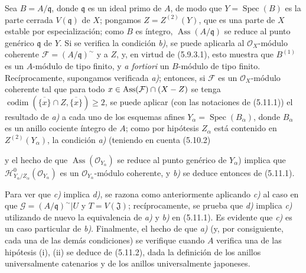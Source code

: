 Sea $B=A/\mathfrak q$, donde $\mathfrak q$ es un ideal primo de $A$, de modo
que $Y=\operatorname{Spec}(B)$ es la parte cerrada $V(\mathfrak q)$ de $X$;
pongamos $Z=Z^{(2)}(Y)$, que es una parte de $X$ estable por especialización;
como $B$ es íntegro, $\operatorname{Ass}(A/\mathfrak q)$ se reduce al punto
genérico $\mathfrak q$ de $Y$. Si se verifica la condición \emph{b)}, se puede
aplicarla al $\mathcal O_X$-módulo coherente
$\mathcal F=(A/\mathfrak q)^\sim$ y a $Z$, y, en virtud de (5.9.3.1), esto
muestra que $B^{(1)}$ es un $A$-módulo de tipo finito, y \emph{a fortiori} un
$B$-módulo de tipo finito. Recíprocamente, supongamos verificada \emph{a)}; entonces, si
$\mathcal F$ es un $\mathcal O_X$-módulo coherente tal que para todo
$x\in\operatorname{Ass}(\mathcal F)\cap(X- Z)$ se tenga
$\operatorname{codim}(\overline{\{x\}}\cap Z,\overline{\{x\}})\geq2$, se puede
aplicar (con las notaciones de (5.11.1)) el resultado de \emph{a)} a cada uno de los esquemas afines
$Y_\alpha=\operatorname{Spec}(B_\alpha)$, donde $B_\alpha$ es un anillo cociente
íntegro de $A$; como por hipótesis $Z_\alpha$ está contenido
en $Z^{(2)}(Y_\alpha)$, la condición \emph{a)} (teniendo en cuenta (5.10.2)


y el hecho de que $\operatorname{Ass}(\mathcal O_{Y_\alpha})$ se reduce al punto
genérico de $Y_\alpha$) implica que
$\mathcal H^0_{Y_\alpha/Z_\alpha}(\mathcal O_{Y_\alpha})$ es un
$\mathcal O_{Y_\alpha}$-módulo coherente, y \emph{b)} se deduce entonces de (5.11.1).

Para ver que \emph{c)} implica \emph{d)}, se razona como anteriormente aplicando \emph{c)} al
caso en que $\mathcal G=(A/\mathfrak q)^\sim\vert U$ y $T=V(\mathfrak J)$;
recíprocamente, se prueba que \emph{d)} implica \emph{c)} utilizando de nuevo la equivalencia de
\emph{a)} y \emph{b)} en (5.11.1). Es evidente que \emph{c)} es un caso particular de \emph{b)}.
Finalmente, el hecho de que \emph{a)} (y, por consiguiente, cada una de las demás condiciones) se verifique
cuando $A$ verifica una de las hipótesis (i), (ii) se deduce de (5.11.2), dada la
definición de los anillos universalmente catenarios y de los anillos
universalmente japoneses.

